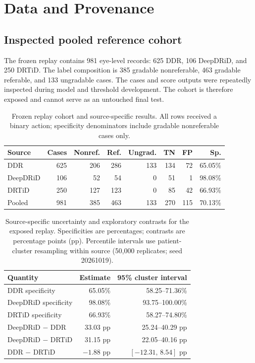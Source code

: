 \documentclass[11pt]{article}
\begin{document}
\section{Data and Provenance}
\subsection{Inspected pooled reference cohort}
The frozen replay contains 981 eye-level records: 625 DDR, 106 DeepDRiD, and 250 DRTiD. The label composition is 385 gradable nonreferable, 463 gradable referable, and 133 ungradable cases. The cases and score outputs were repeatedly inspected during model and threshold development. The cohort is therefore exposed and cannot serve as an untouched final test.

\begin{table}[t]
\centering
\caption{Frozen replay cohort and source-specific results. All rows received a binary action; specificity denominators include gradable nonreferable cases only.}
\label{tab:cohort}
\begin{tabular}{lrrrrrrr}
\toprule
Source & Cases & Nonref. & Ref. & Ungrad. & TN & FP & Sp. \\
\midrule
DDR & 625 & 206 & 286 & 133 & 134 & 72 & 65.05\% \\
DeepDRiD & 106 & 52 & 54 & 0 & 51 & 1 & 98.08\% \\
DRTiD & 250 & 127 & 123 & 0 & 85 & 42 & 66.93\% \\
\midrule
Pooled & 981 & 385 & 463 & 133 & 270 & 115 & 70.13\% \\
\bottomrule
\end{tabular}
\end{table}

\begin{table}[t]
\centering
\caption{Source-specific uncertainty and exploratory contrasts for the exposed replay. Specificities are percentages; contrasts are percentage points (pp). Percentile intervals use patient-cluster resampling within source (50,000 replicates; seed 20261019).}
\label{tab:source-bootstrap}
\small
\begin{tabularx}{\linewidth}{>{\raggedright\arraybackslash}Xrr}
\toprule
Quantity & Estimate & 95\% cluster interval \\
\midrule
DDR specificity & 65.05\% & 58.25--71.36\% \\
DeepDRiD specificity & 98.08\% & 93.75--100.00\% \\
DRTiD specificity & 66.93\% & 58.27--74.80\% \\
DeepDRiD $-$ DDR & 33.03 pp & 25.24--40.29 pp \\
DeepDRiD $-$ DRTiD & 31.15 pp & 22.05--40.16 pp \\
DDR $-$ DRTiD & $-1.88$ pp & $[-12.31,\,8.54]$ pp \\
\bottomrule
\end{tabularx}
\end{table}
\end{document}
